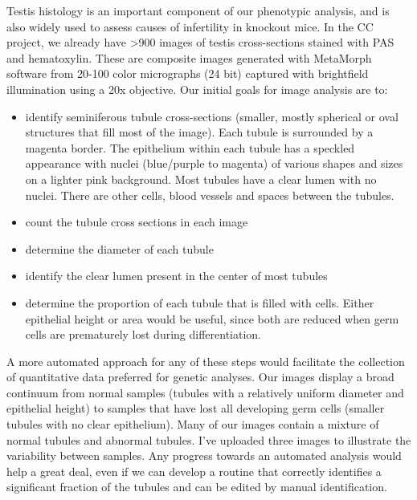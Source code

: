 \documentclass{InsightArticle}
\begin{document}
Testis histology is an important component of our phenotypic analysis, and is
also widely used to assess causes of infertility in knockout mice.  In the CC
project, we already have >900 images of testis cross-sections stained with PAS
and hematoxylin.  These are composite images generated with MetaMorph software
from 20-100 color micrographs (24 bit) captured with brightfield illumination
using a 20x objective. Our initial goals for image analysis are to:

\begin{itemize}
\item identify seminiferous tubule cross-sections (smaller, mostly spherical or
oval structures that fill most of the image).  Each tubule is surrounded by a
magenta border. The epithelium within each tubule has a speckled appearance
with nuclei (blue/purple to magenta) of various shapes and sizes on a lighter
pink background.  Most tubules have a clear lumen with no nuclei.  There are
other cells, blood vessels and spaces between the tubules.
\item count the tubule cross sections in each image
\item determine the diameter of each tubule
\item identify the clear lumen present in the center of most tubules
\item determine the proportion of each tubule that is filled with cells.
Either epithelial height or area would be useful, since both are reduced when
germ cells are prematurely lost during differentiation.
\end{itemize}

A more automated approach for any of these steps would facilitate the
collection of quantitative data preferred for genetic analyses.  Our images
display a broad continuum from normal samples (tubules with a relatively
uniform diameter and epithelial height) to samples that have lost all
developing germ cells (smaller tubules with no clear epithelium).  Many of our
images contain a mixture of normal tubules and abnormal tubules.  I’ve uploaded
three images to illustrate the variability between samples. Any progress
towards an automated analysis would help a great deal, even if we can develop a
routine that correctly identifies a significant fraction of the tubules and can
be edited by manual identification.



%
%



\end{document}
